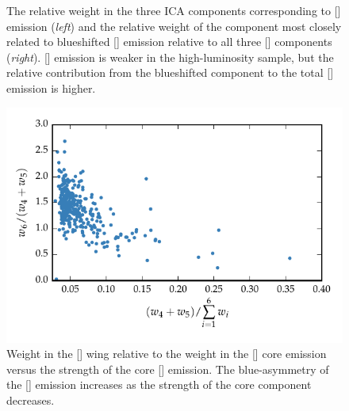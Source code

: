\begin{figure}
    \captionsetup[subfigure]{labelformat=empty}
    \centering
    \subfloat[\label{fig:mfica_oiii_weight_a}]{}
    \subfloat[\label{fig:mfica_oiii_weight_b}]{}
    \caption[{The relative weight in the three ICA components corresponding to [] emission and the relative weight of the component most closely related to blueshifted [] emission relative to all three [] components.}]{The relative weight in the three ICA components corresponding to [] emission ({\em left}) and the relative weight of the component most closely related to blueshifted [] emission relative to all three [] components ({\em right}). [] emission is weaker in the high-luminosity sample, but the relative contribution from the blueshifted component to the total [] emission is higher.}     
    \label{fig:mfica_oiii_weight}
\end{figure}

\begin{figure}
    \centering
    \includegraphics[width=\columnwidth]{figures/chapter04/oiii_core_strength_blueshift.pdf} 
    \caption[{Weight in the [] wing relative to the weight in the [] core emission versus the strength of the core [] emission.}]{Weight in the [] wing relative to the weight in the [] core emission versus the strength of the core [] emission. The blue-asymmetry of the [] emission increases as the strength of the core component decreases.}     
    \label{fig:oiii_core_strength_blueshift}
\end{figure}

